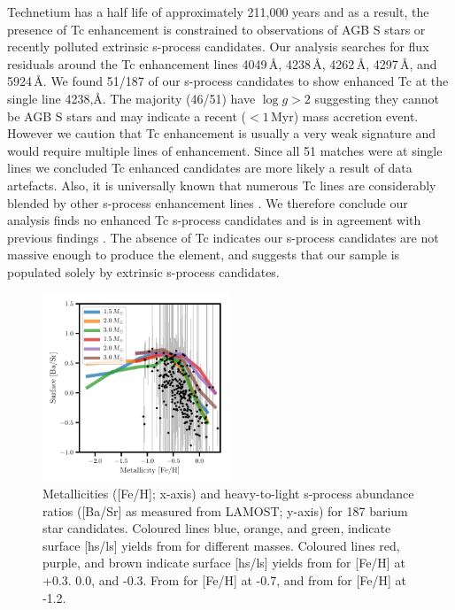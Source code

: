 \documentclass[a4paper,fleqn,usenatbib]{mnras}
\begin{document}
Technetium has a half life of approximately 211,000 years and as a result, the presence of Tc enhancement is constrained to observations of AGB S stars \citep{jorissen1993} or recently polluted extrinsic s-process candidates. Our analysis searches for flux residuals around the Tc enhancement lines 4049\,\AA, 4238\,\AA, 4262\,\AA, 4297\,\AA, and 5924\,\AA. We found 51/187 of our s-process candidates to show enhanced Tc at the single line 4238,\AA. The majority (46/51) have $\log{g} > 2$ suggesting they cannot be AGB S stars and may indicate a recent ($<1\,\textrm{Myr}$) mass accretion event. However we caution that Tc enhancement is usually a very weak signature and would require multiple lines of enhancement. Since all 51 matches were at single lines we concluded Tc enhanced candidates are more likely a result of data artefacts. Also, it is universally known that numerous Tc lines are considerably blended by other s-process enhancement lines \citep[e.g.,][]{van1999}. We therefore conclude our analysis finds no enhanced Tc s-process candidates and is in agreement with previous findings \citep[e.g.,][]{little1987,smith1984,smith1983}. The absence of Tc indicates our s-process candidates are not massive enough to produce the element, and suggests that our sample is populated solely by extrinsic s-process candidates.  


\begin{figure}
	\includegraphics[width=0.5\textwidth]{yields_test.pdf}
    \caption{Metallicities ([Fe/H]; x-axis) and heavy-to-light s-process abundance ratios ([Ba/Sr] as measured from LAMOST; y-axis) for 187 barium star candidates. Coloured lines blue, orange, and green, indicate surface [hs/ls] yields from \citet{cristallo2015} for different masses. Coloured lines red, purple, and brown indicate surface [hs/ls] yields from \citet{karakas_lugaro2016} for [Fe/H] at +0.3. 0.0, and -0.3. From \citet{karakas2018} for [Fe/H] at -0.7, and from \citet{fishlock2014} for [Fe/H] at -1.2.}
    \label{fig:figure3}
\end{figure}
\end{document}
